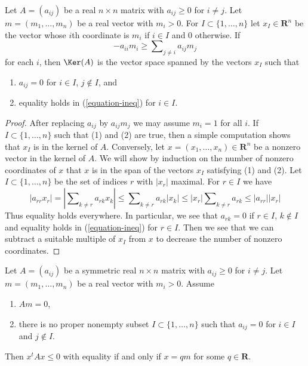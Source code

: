 \begin{lemma}
\label{lemma-recurring-real}
Let $A = (a_{ij})$ be a real $n \times n$ matrix with
$a_{ij} \geq 0$ for $i \not = j$. Let $m = (m_1, \ldots, m_n)$ be a real
vector with $m_i > 0$. For $I \subset \{1, \ldots, n\}$ let
$x_I \in \mathbf{R}^n$
be the vector whose $i$th coordinate is $m_i$ if $i \in I$
and $0$ otherwise. If
\begin{equation}
\label{equation-ineq}
-a_{ii}m_i \geq \sum\nolimits_{j \not = i} a_{ij}m_j
\end{equation}
for each $i$, then $\Ker(A)$ is the vector space
spanned by the vectors $x_I$ such that
\begin{enumerate}
\item $a_{ij} = 0$ for $i \in I$, $j \not \in I$, and
\item equality holds in (\ref{equation-ineq}) for $i \in I$.
\end{enumerate}
\end{lemma}

\begin{proof}
After replacing $a_{ij}$ by $a_{ij}m_j$ we may assume $m_i = 1$ for all $i$.
If $I \subset \{1, \ldots, n\}$ such that (1) and (2) are true,
then a simple computation shows that $x_I$ is in the kernel of $A$.
Conversely, let $x = (x_1, \ldots, x_n) \in \mathbf{R}^n$ be a
nonzero vector in the kernel of $A$. We will show by induction
on the number of nonzero coordinates of $x$ that $x$ is in the
span of the vectors $x_I$ satisfying (1) and (2). Let
$I \subset \{1, \ldots, n\}$ be the set of indices $r$ with $|x_r|$ maximal.
For $r \in I$ we have
$$
|a_{rr} x_r| = |\sum\nolimits_{k \not = r} a_{rk}x_k| \leq
\sum\nolimits_{k \not = r} a_{rk}|x_k| \leq
|x_r| \sum\nolimits_{k \not = r} a_{rk} \leq |a_{rr}||x_r|
$$
Thus equality holds everywhere. In particular, we see that
$a_{rk} = 0$ if $r \in I$, $k \not \in I$ and equality holds
in (\ref{equation-ineq}) for $r \in I$. Then we see that we
can subtract a suitable multiple of $x_I$ from $x$ to decrease
the number of nonzero coordinates.
\end{proof}

\begin{lemma}
\label{lemma-recurring-symmetric-real}
Let $A = (a_{ij})$ be a symmetric real $n \times n$ matrix with
$a_{ij} \geq 0$ for $i \not = j$.
Let $m = (m_1, \ldots, m_n)$ be a real vector with $m_i > 0$.
Assume
\begin{enumerate}
\item $Am = 0$,
\item there is no proper nonempty subset $I \subset \{1, \ldots, n\}$
such that $a_{ij} = 0$ for $i \in I$ and $j \not \in I$.
\end{enumerate}
Then $x^t A x \leq 0$ with equality if and only if $x = qm$
for some $q \in \mathbf{R}$.
\end{lemma}

